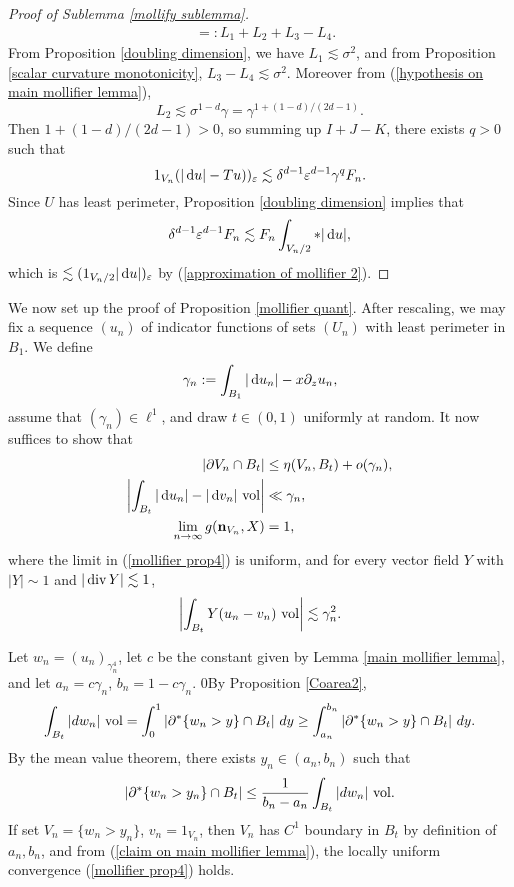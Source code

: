 \begin{proof}[Proof of Sublemma \ref{mollify sublemma}]
\begin{align*}
&=: L_1 + L_2 + L_3 - L_4.
\end{align*}
From Proposition \ref{doubling dimension}, we have $L_1 \lesssim \sigma^2$, and from Proposition \ref{scalar curvature monotonicity}, $L_3 - L_4 \lesssim \sigma^2$.
Moreover from (\ref{hypothesis on main mollifier lemma}),
$$L_2 \lesssim \sigma^{1-d} \gamma = \gamma^{1 + (1 - d)/(2d - 1)}.$$
Then $1 + (1 - d)/(2d - 1) > 0$, so summing up $I + J - K$, there exists $q > 0$ such that
\begin{equation}\label{big bound 1}
1_{V_n}(|\mathop{}\!\mathrm{d} u| - Tu))_\varepsilon \lesssim \delta^{d - 1} \varepsilon^{d - 1} \gamma^q F_n.
\end{equation}
Since $U$ has least perimeter, Proposition \ref{doubling dimension} implies that
$$\delta^{d - 1} \varepsilon^{d - 1} F_n \lesssim F_n \int_{V_n/2} *|\mathop{}\!\mathrm{d} u|,$$
which is $\lesssim (1_{V_n/2}|\mathop{}\!\mathrm{d} u|)_\varepsilon$ by (\ref{approximation of mollifier 2}).
\end{proof}

We now set up the proof of Proposition \ref{mollifier quant}.
After rescaling, we may fix a sequence $(u_n)$ of indicator functions of sets $(U_n)$ with least perimeter in $B_1$.
We define
$$\gamma_n := \int_{B_1} |\mathop{}\!\mathrm{d} u_n| - x\partial_z u_n,$$
assume that $(\gamma_n) \in \ell^1$, and draw $t \in (0, 1)$ uniformly at random.
It now suffices to show that
\begin{align}
|\partial V_n \cap B_t| &\leq \eta(V_n, B_t) + o(\gamma_n), \label{mollifier prop1}\\
\left|\int_{B_t} |\mathop{}\!\mathrm{d} u_n| - |\mathop{}\!\mathrm{d} v_n| ~\mathrm{vol}\right| &\ll \gamma_n, \label{mollifier prop2}\\
\lim_{n \to \infty} g(\mathbf n_{V_n}, X) &= 1, \label{mollifier prop4}
\end{align}
where the limit in (\ref{mollifier prop4}) is uniform, and for every vector field $Y$ with $|Y| \sim 1$ and $|\operatorname{div} Y| \lesssim 1$,
\begin{equation}
\left|\int_{B_t} Y(u_n - v_n)~\mathrm{vol}\right| \lesssim \gamma_n^2. \label{mollifier prop3}
\end{equation}

Let $w_n = (u_n)_{\gamma_n^4}$, let $c$ be the constant given by Lemma \ref{main mollifier lemma}, and let $a_n = c\gamma_n$, $b_n = 1 - c\gamma_n$.
0By Proposition \ref{Coarea2},
$$\int_{B_t} |dw_n| ~\mathrm{vol} = \int_0^1 |\partial^* \{w_n > y\} \cap B_t| ~dy \geq \int_{a_n}^{b_n} |\partial^* \{w_n > y\} \cap B_t| ~dy.$$
By the mean value theorem, there exists $y_n \in (a_n, b_n)$ such that
\begin{equation}\label{MVT mollifier}
|\partial^* \{w_n > y_n\} \cap B_t| \leq \frac{1}{b_n - a_n} \int_{B_t} |dw_n| ~\mathrm{vol}.
\end{equation}
If set $V_n = \{w_n > y_n\}$, $v_n = 1_{V_n}$, then $V_n$ has $C^1$ boundary in $B_t$ by definition of $a_n, b_n$, and from (\ref{claim on main mollifier lemma}), the locally uniform convergence (\ref{mollifier prop4}) holds.

